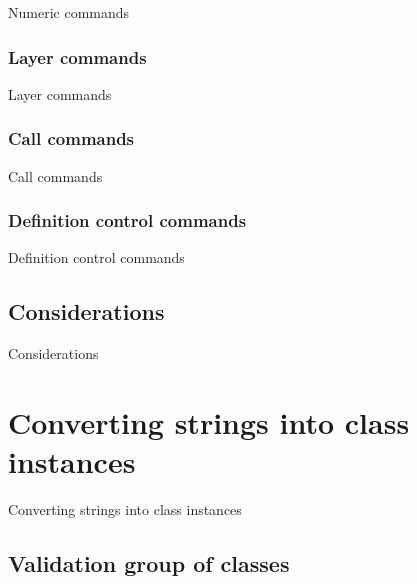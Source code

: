 \documentclass[11pt,twoside,openany,x11names,svgnames]{memoir}
\begin{document}
Numeric commands

\subsubsection{Layer commands}\label{Layer-commands}

Layer commands

\subsubsection{Call commands}\label{Call-commands}

Call commands

\subsubsection{Definition control commands}\label{Definition-control-commands}

Definition control commands

\subsection{Considerations}\label{Considerations2}

Considerations

\section{Converting strings into class instances}\label{Converting-strings-into-class-instances}

Converting strings into class instances

\subsection{Validation group of classes}\label{Validation-group-of-classes}
\end{document}
